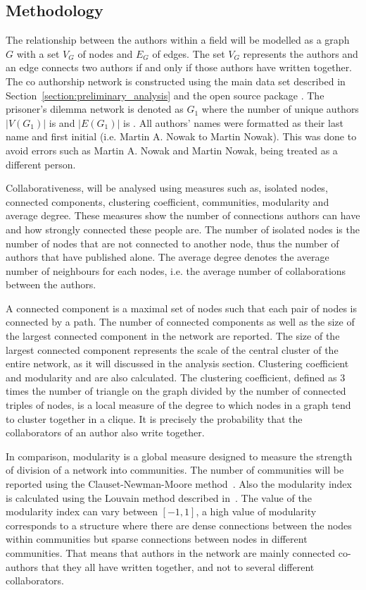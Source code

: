 \documentclass{article}
\theoremstyle{definition}
\newcommand{\authors}{}
\newcommand{\edges}{}
\begin{document}
\subsection{Methodology}\label{section:methodology}

The relationship between the authors within a field will be modelled as a graph \(G\) with
a set \(V_G\) of nodes and \(E_G\) of edges. The set \(V_G\) represents the authors
and an edge connects two authors if and only if those authors have written together.
The co authorship network is constructed using the main data set described in
Section~\ref{section:preliminary_analysis} and the open source package
\cite{networkx}. The prisoner's dilemma network is denoted as \(G_1\) where the
number of unique authors \(|V(G_1)|\) is \authors and \(|E(G_1)|\) is \edges.
All authors' names were formatted as their last name and
first initial (i.e. Martin A. Nowak to Martin Nowak). This was done to avoid errors
such as Martin A. Nowak and Martin Nowak, being treated as a different person.

Collaborativeness, will be analysed using measures such as, isolated nodes,
connected components, clustering coefficient, communities, modularity and average degree.
These measures show the number of connections authors can have
and how strongly connected these people are. The number of isolated nodes is the
number of nodes that are not connected to another node, thus the
number of authors that have published alone. The average degree denotes the average
number of neighbours for each nodes, i.e. the average number of collaborations
between the authors.

A connected component is a maximal set of nodes such that each pair of nodes is
connected by a path. The number of connected components as well as the size of the
largest connected component in the network are reported.
The size of the largest connected component represents the scale of the central cluster
of the entire network, as it will discussed in the analysis section.
Clustering coefficient and modularity and are also calculated. The clustering
coefficient, defined as 3 times the number of triangle on the graph divided
by the number of connected triples of nodes, is a local measure of the degree to
which nodes in a graph tend to cluster together
in a clique. It is precisely the probability that the collaborators
of an author also write together.

In comparison, modularity is a global measure designed to measure the strength of
division of a network into communities. The number of communities will be reported
using the Clauset-Newman-Moore method~\cite{clauset2004}. Also the modularity index
is calculated using the Louvain method described in~\cite{Blondel2008}. The value
of the modularity index can vary between \([-1, 1]\), a high value of modularity
corresponds to a structure where there are dense connections between the nodes within
communities but sparse connections between nodes in different communities.
That means that authors in the network are mainly connected co-authors that they
all have written together, and not to several different collaborators.
\end{document}
